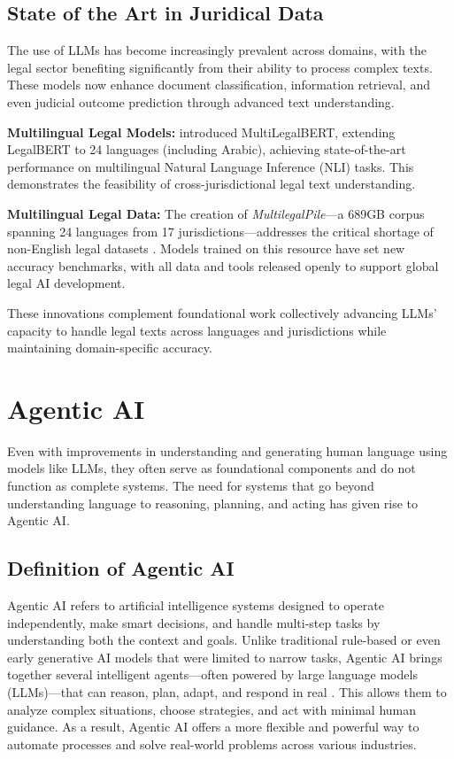 \subsection{State of the Art in Juridical Data}
The use of LLMs has become increasingly prevalent across domains, with the legal sector benefiting significantly from their ability to process complex texts. These models now enhance document classification, information retrieval, and even judicial outcome prediction through advanced text understanding.

\textbf{Multilingual Legal Models:} \citep{chalkidis2023multilegalbert} introduced MultiLegalBERT, extending LegalBERT to 24 languages (including Arabic), achieving state-of-the-art performance on multilingual Natural Language Inference (NLI) tasks. This demonstrates the feasibility of cross-jurisdictional legal text understanding. 

\textbf{Multilingual Legal Data:} The creation of \textit{MultilegalPile}—a 689GB corpus spanning 24 languages from 17 jurisdictions—addresses the critical shortage of non-English legal datasets \citep{NiklausMSCH24}. Models trained on this resource have set new accuracy benchmarks, with all data and tools released openly to support global legal AI development.

These innovations complement foundational work collectively advancing LLMs' capacity to handle legal texts across languages and jurisdictions while maintaining domain-specific accuracy.


\section{Agentic AI}
Even with  improvements in understanding and generating human language using models like LLMs, they often serve as foundational components  and do not function as complete systems. The need for systems that go beyond understanding language to reasoning, planning, and acting has given rise to Agentic AI.
\subsection{Definition of Agentic AI}
Agentic AI refers to artificial intelligence systems designed to operate independently, make smart decisions, and handle multi-step tasks by understanding both the context and goals. Unlike traditional rule-based or even early generative AI models that were limited to narrow tasks, Agentic AI brings together several intelligent agents—often powered by large language models (LLMs)—that can reason, plan, adapt, and respond in real \citep{aisera2024agentic}. This allows them to analyze complex situations, choose strategies, and act with minimal human guidance. As a result, Agentic AI offers a more flexible and powerful way to automate processes and solve real-world problems across various industries.
